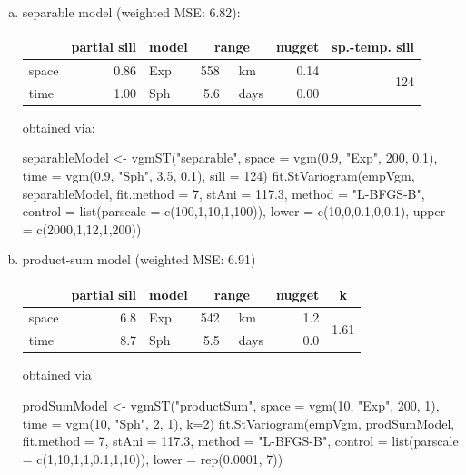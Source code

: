 \begin{enumerate}[a)] 
\item separable model (weighted MSE: 6.82):

\nopagebreak
\begin{tabular}{l|rlrlrr}
\toprule
  & partial sill & model & \multicolumn{2}{c}{range}  & nugget & sp.-temp. sill \\ \midrule  
space & 0.86 & Exp & 558 & \hspace{-2\tabcolsep}~km & 0.14 & \multirow{2}{*}{124} \\
time & 1.00 & Sph & 5.6 & \hspace{-2\tabcolsep}~days & 0.00 & \\ \bottomrule
\end{tabular}

obtained via:

\begin{example*}
separableModel <- vgmST("separable", 
                        space = vgm(0.9, "Exp", 200, 0.1),
                        time = vgm(0.9, "Sph", 3.5, 0.1),
                        sill = 124)
fit.StVariogram(empVgm, separableModel, fit.method = 7, 
                stAni = 117.3, method = "L-BFGS-B", 
                control = list(parscale = c(100,1,10,1,100)),
                lower = c(10,0,0.1,0,0.1), 
                upper = c(2000,1,12,1,200))
\end{example*}

\item 
product-sum model (weighted MSE: 6.91)

\nopagebreak
\begin{tabular}{l|rlrlrc}
\toprule
  & partial sill & model & \multicolumn{2}{c}{range}  & nugget & k\\ \midrule  
space & 6.8 & Exp & 542 & \hspace{-2\tabcolsep}~km  & 1.2 & \multirow{2}{*}{1.61} \\
time & 8.7 & Sph & 5.5 & \hspace{-2\tabcolsep}~days & 0.0 & \\ \bottomrule
\end{tabular}

obtained via

\begin{example*}
prodSumModel <- vgmST("productSum",
                      space = vgm(10, "Exp", 200, 1),
                      time = vgm(10, "Sph",   2, 1), 
                      k=2)
fit.StVariogram(empVgm, prodSumModel, fit.method = 7, 
                stAni = 117.3, method = "L-BFGS-B", 
                control = list(parscale = c(1,10,1,1,0.1,1,10)),
                lower = rep(0.0001, 7))
\end{example*}


\end{enumerate}
